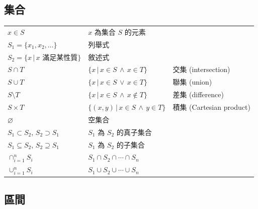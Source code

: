 \documentclass[12pt]{extarticle}
\newcommand{\ds}{\displaystyle}
\theoremstyle{definition}
\begin{document}
\subsection*{集合}

\begin{table}[!htbp]
  \centering
  \begin{tabular}{lll}
    \toprule
    $x\in S$ & $x$ 為集合 $S$ 的元素 &  \\
    $S_1 =\{x_1, x_2, \ldots\}$ & 列舉式   &  \\
    $S_2 =\{ x\,|\, x \text{ 滿足某性質}\}$ & 敘述式 & \\
    $S\cap T$ & $\{x\,|\, x\in S\,\wedge\,x\in T\}$ & 交集 (intersection)    \\
    $S\cup T$ & $\{x\,|\, x\in S\,\vee\,x\in T\}$ & 聯集 (union)    \\
    $S\setminus T$ & $\{x\,|\, x\in S\,\wedge\,x\not\in T\}$ & 差集 (difference)   \\
    $S\times T$ & $\{(x, y)\,|\, x\in S\,\wedge\,y\in T\}$ & 積集 (Cartesian product)  \\
    $\varnothing$ & 空集合 & \\
    $S_1\subset S_2$, $S_2\supset S_1$ & $S_1$ 為 $S_2$ 的真子集合 & \\
    $S_1\subseteq S_2$, $S_2\supseteq S_1$ & $S_1$ 為 $S_2$ 的子集合 & \\
    $\ds\cap_{i=1}^n S_i$ & $S_1\cap S_2\cap\cdots\cap S_n$ &    \\
    $\ds\cup_{i=1}^n S_i$ & $S_1\cup S_2\cup\cdots\cup S_n$ &    \\
    \bottomrule
  \end{tabular}
\end{table}

\newpage

\subsection*{區間}
\end{document}
